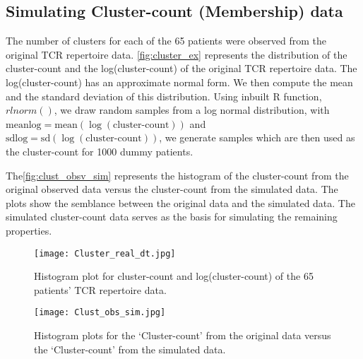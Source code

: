 \subsection{Simulating Cluster-count (Membership) data}\label{subsubsec:sim_clust_cnt}
The number of clusters for each of the 65 patients were observed from the original TCR repertoire data. \autoref{fig:cluster_ex} represents the distribution of the cluster-count and the log(cluster-count) of the original TCR repertoire data. The log(cluster-count) has an approximate normal form. We then compute the mean and the standard deviation of this distribution. Using inbuilt R function, $rlnorm()$, we draw random samples from a log normal distribution, with $\text{meanlog} = \text{mean}(\log(\text{cluster-count}))$ and $\text{sdlog} = \text{sd}(\log(\text{cluster-count}))$, we generate samples which are then used as the cluster-count for 1000 dummy patients.\par
The\autoref{fig:clust_obsv_sim} represents the histogram of the cluster-count from the original observed data versus the cluster-count from the simulated data. The plots show the semblance between the original data and the simulated data. The simulated cluster-count data serves as the basis for simulating the remaining properties.\par
\begin{figure}[H]
\centering
\texttt{[image: Cluster\_real\_dt.jpg]}
\caption{Histogram plot for cluster-count and log(cluster-count) of the 65 patients' TCR repertoire data.}
\label{fig:cluster_ex}
\end{figure}
\begin{figure}[H]
\centering
\texttt{[image: Clust\_obs\_sim.jpg]}
\caption{Histogram plots for the \lq Cluster-count' from the original data versus the \lq Cluster-count' from the simulated data.}
\label{fig:clust_obsv_sim}
\end{figure}
